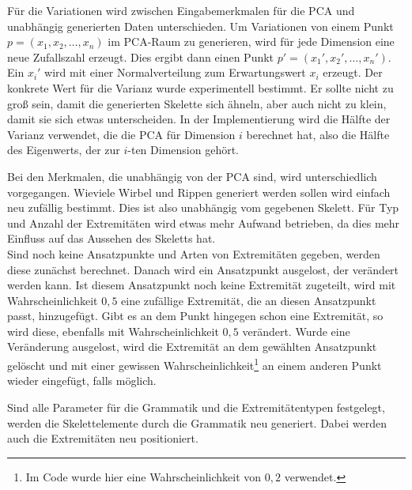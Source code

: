 Für die Variationen wird zwischen Eingabemerkmalen für die PCA und unabhängig generierten Daten unterschieden. Um Variationen von einem Punkt $p = (x_1, x_2,\dots, x_n)$ im PCA-Raum zu generieren, wird für jede Dimension eine neue Zufallszahl erzeugt. Dies ergibt dann einen Punkt $p' = (x_1', x_2',\dots,x_n')$. Ein $x_i'$ wird mit einer Normalverteilung zum Erwartungswert $x_i$ erzeugt.
Der konkrete Wert für die Varianz wurde experimentell bestimmt. Er sollte nicht zu groß sein, damit die generierten Skelette sich ähneln, aber auch nicht zu klein, damit sie sich etwas unterscheiden. In der Implementierung wird
die Hälfte der Varianz verwendet, die die PCA für Dimension $i$ berechnet hat, also die Hälfte des Eigenwerts, der zur $i$-ten Dimension gehört. 

Bei den Merkmalen, die unabhängig von der PCA sind, wird unterschiedlich vorgegangen. Wieviele Wirbel und Rippen generiert werden sollen wird einfach neu zufällig bestimmt. Dies ist also unabhängig vom gegebenen Skelett.
Für Typ und Anzahl der Extremitäten wird etwas mehr Aufwand betrieben, da dies mehr Einfluss auf das Aussehen des Skeletts hat.\\
Sind noch keine Ansatzpunkte und Arten von Extremitäten gegeben, werden diese zunächst berechnet. Danach wird ein Ansatzpunkt ausgelost, der verändert werden kann. Ist diesem Ansatzpunkt noch keine Extremität zugeteilt, wird mit Wahrscheinlichkeit $0{,}5$ eine zufällige Extremität, die an diesen Ansatzpunkt passt, hinzugefügt. Gibt es an dem Punkt hingegen schon eine Extremität, so wird diese, ebenfalls mit Wahrscheinlichkeit $0{,}5$ verändert. Wurde eine Veränderung ausgelost, wird die Extremität an dem gewählten Ansatzpunkt gelöscht und mit einer gewissen Wahrscheinlichkeit\footnote{Im Code wurde hier eine Wahrscheinlichkeit von $0{,}2$ verwendet.} an einem anderen Punkt wieder eingefügt, falls möglich.

Sind alle Parameter für die Grammatik und die Extremitätentypen festgelegt, werden die Skelettelemente durch die Grammatik neu generiert. Dabei werden auch die Extremitäten neu positioniert.

